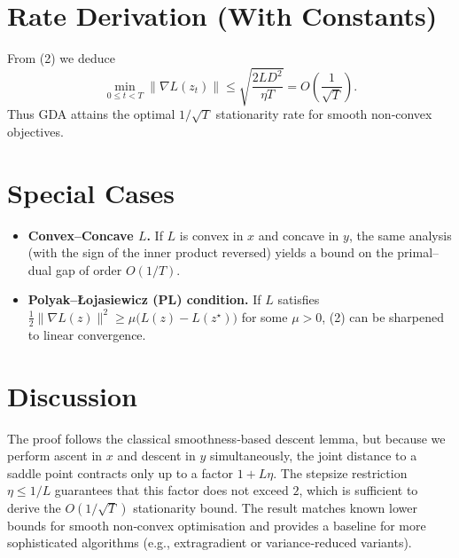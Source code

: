 \documentclass{article}
\begin{document}
\section*{Rate Derivation (With Constants)}
From (2) we deduce
\[
\min_{0\le t<T}\|\nabla L(z_t)\|
\le \sqrt{\frac{2L D^{2}}{\eta T}}
= O\!\left(\frac{1}{\sqrt{T}}\right).
\]
Thus GDA attains the optimal $1/\sqrt{T}$ stationarity rate for smooth non‑convex objectives.

\section*{Special Cases}
\begin{itemize}
\item \textbf{Convex–Concave $L$.} If $L$ is convex in $x$ and concave in $y$, the same analysis (with the sign of the inner product reversed) yields a bound on the primal–dual gap of order $O(1/T)$.
\item \textbf{Polyak–Łojasiewicz (PL) condition.} If $L$ satisfies $\frac{1}{2}\|\nabla L(z)\|^{2}\ge \mu\bigl(L(z)-L(z^\star)\bigr)$ for some $\mu>0$, (2) can be sharpened to linear convergence.
\end{itemize}

\section*{Discussion}
The proof follows the classical smoothness‑based descent lemma, but because we perform ascent in $x$ and descent in $y$ simultaneously, the joint distance to a saddle point contracts only up to a factor $1+L\eta$. The stepsize restriction $\eta\le 1/L$ guarantees that this factor does not exceed $2$, which is sufficient to derive the $O(1/\sqrt{T})$ stationarity bound. The result matches known lower bounds for smooth non‑convex optimisation and provides a baseline for more sophisticated algorithms (e.g., extragradient or variance‑reduced variants).
\end{document}
